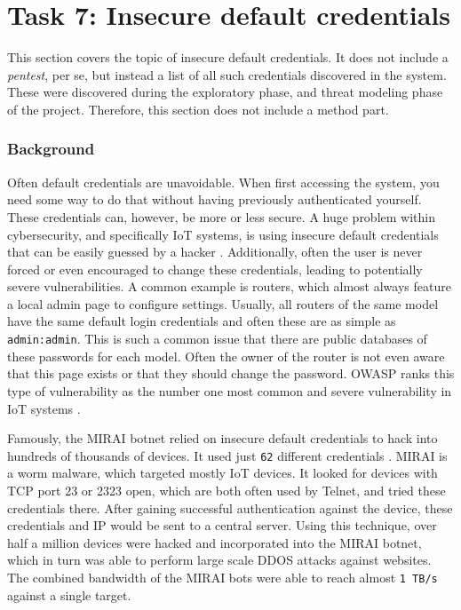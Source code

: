 \section{Task 7: Insecure default credentials}
This section covers the topic of insecure default credentials. It does not include a \textit{pentest}, per se, but instead a list of all such credentials discovered in the system. These were discovered during the exploratory phase, and threat modeling phase of the project. Therefore, this section does not include a method part.

\subsubsection{Background}
Often default credentials are unavoidable. When first accessing the system, you need some way to do that without having previously authenticated yourself. These credentials can, however, be more or less secure. A huge problem within cybersecurity, and specifically IoT systems, is using insecure default credentials that can be easily guessed by a hacker \cite{owasp-iot-top10}. Additionally, often the user is never forced or even encouraged to change these credentials, leading to potentially severe vulnerabilities. A common example is routers, which almost always feature a local admin page to configure settings. Usually, all routers of the same model have the same default login credentials and often these are as simple as \texttt{admin:admin}. This is such a common issue that there are public databases of these passwords for each model. Often the owner of the router is not even aware that this page exists or that they should change the password. OWASP ranks this type of vulnerability as the number one most common and severe vulnerability in IoT systems \cite{owasp-iot-top10}.

Famously, the MIRAI botnet relied on insecure default credentials to hack into hundreds of thousands of devices. It used just \texttt{62} different credentials \cite{understanding-mirai}. MIRAI is a worm malware, which targeted mostly IoT devices. It looked for devices with TCP port 23 or 2323 open, which are both often used by Telnet, and tried these credentials there. After gaining successful authentication against the device, these credentials and IP would be sent to a central server. Using this technique, over half a million devices were hacked and incorporated into the MIRAI botnet, which in turn was able to perform large scale DDOS attacks against websites. The combined bandwidth of the MIRAI bots were able to reach almost \texttt{1 TB/s} against a single target.

